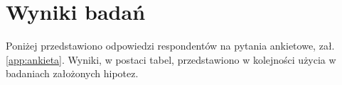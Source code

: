 \documentclass[a4paper,12pt,twoside,openright]{mwrep}
\begin{document}
\chapter*{Wyniki badań}

	Poniżej przedstawiono odpowiedzi respondentów na pytania ankietowe, zał. \ref{app:ankieta}. 
	Wyniki, w postaci tabel, przedstawiono w kolejności użycia w badaniach założonych hipotez.
	
\vspace{\baselineskip} 










































\end{document}
